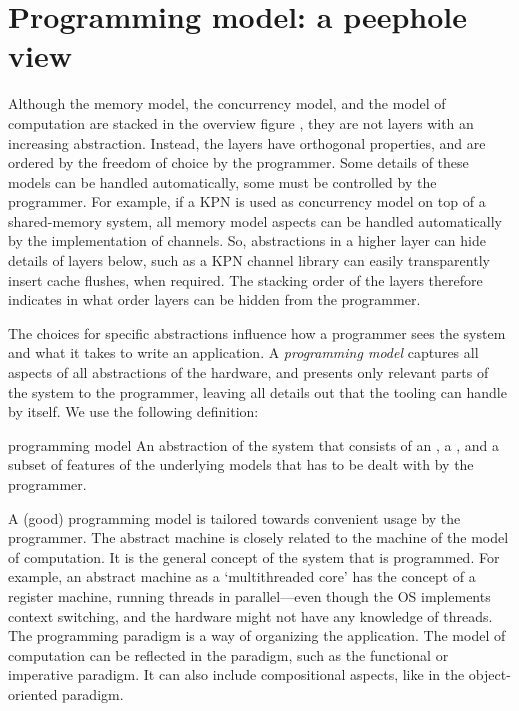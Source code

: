 \section{Programming model: a peephole view}
\label{s:progmodel:programming}

Although the memory model, the concurrency model, and the model of computation are stacked in the overview figure \chapfigpageref, they are not layers with an increasing abstraction.
Instead, the layers have orthogonal properties, and are ordered by the freedom of choice by the programmer.
Some details of these models can be handled automatically, some must be controlled by the programmer.
For example, if a \ac{KPN} is used as concurrency model on top of a shared-memory system, all memory model aspects can be handled automatically by the implementation of channels.
So, abstractions in a higher layer can hide details of layers below, such as a \ac{KPN} channel library can easily transparently insert cache flushes, when required.
The stacking order of the layers therefore indicates in what order layers can be hidden from the programmer.

The choices for specific abstractions influence how a programmer sees the system and what it takes to write an application.
A \emph{programming model} captures all aspects of all abstractions of the hardware, and presents only relevant parts of the system to the programmer, leaving all details out that the tooling can handle by itself.
We use the following definition:
\begin{describe}{programming model}
	An abstraction of the system that consists of an , a , and a subset of features of the underlying models that has to be dealt with by the programmer.
\end{describe}

A (good) programming model is tailored towards convenient usage by the programmer.
The abstract machine is closely related to the machine of the model of computation.
It is the general concept of the system that is programmed.
For example, an abstract machine as a `multithreaded core' has the concept of a register machine, running threads in parallel---even though the \ac{OS} implements context switching, and the hardware might not have any knowledge of threads.
The programming paradigm is a way of organizing the application.
The model of computation can be reflected in the paradigm, such as the functional or imperative paradigm.
It can also include compositional aspects, like in the object-oriented paradigm.

